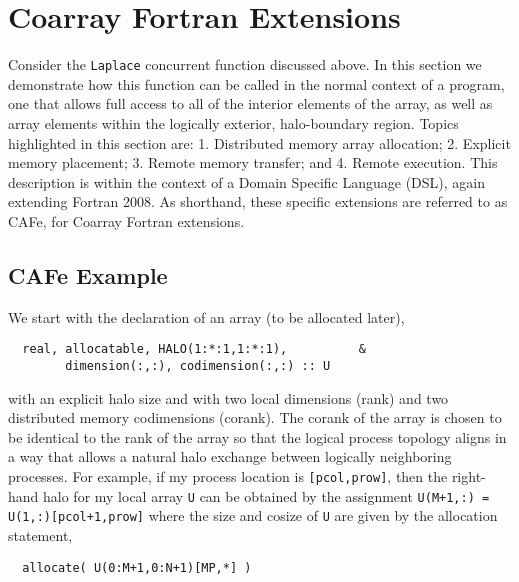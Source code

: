 \section{Coarray Fortran Extensions}


Consider the \texttt{Laplace} concurrent function discussed above.  In this section we demonstrate
how this function can be called in the normal context of a program, one that allows full access to
all of the interior elements of the array, as well as array elements within the logically exterior,
halo-boundary region.  Topics highlighted in this section are: 1. Distributed memory array
allocation; 2. Explicit memory placement; 3. Remote memory transfer; and 4. Remote execution.  This
description is within the context of a Domain Specific Language (DSL), again extending Fortran 2008.
As shorthand, these specific extensions are referred to as CAFe, for Coarray Fortran extensions.

\subsection{CAFe Example}

We start with the declaration of an array (to be allocated later),
\begin{verbatim}
  real, allocatable, HALO(1:*:1,1:*:1),          &
        dimension(:,:), codimension(:,:) :: U
\end{verbatim}
with an explicit halo size and with two local dimensions (rank) and two distributed memory
codimensions (corank).  The corank of the array is chosen to be identical to the rank of
the array so that the logical process topology aligns in a way that allows a natural
halo exchange between logically neighboring processes.  For example, if my process
location is \texttt{[pcol,prow]}, then the right-hand halo for my local array \texttt{U}
can be obtained by the assignment \texttt{U(M+1,:) = U(1,:)[pcol+1,prow]} where the size
and cosize of \texttt{U} are given by the allocation statement,
\begin{verbatim}
  allocate( U(0:M+1,0:N+1)[MP,*] )
\end{verbatim}

